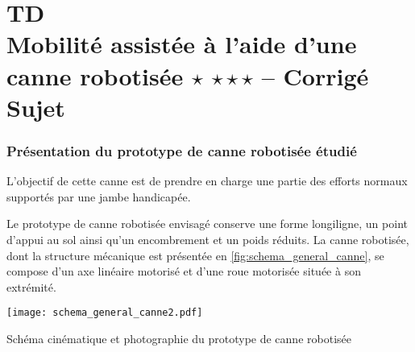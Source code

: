 \chapter*{TD  \\ 
Mobilité assistée à l'aide d'une canne robotisée \ifnormal $\star$ \else \fi \iftdifficile $\star\star\star$ \else \fi -- 
\ifprof Corrigé \else Sujet \fi}

\iflivret {} \else
\ifprof  {} \else \fi
\fi

\setcounter{question}{0}




\subsection*{Présentation du prototype de canne robotisée étudié}
\ifprof
\else

L'objectif de cette canne est de prendre en charge une partie des efforts normaux supportés par une jambe handicapée.

Le prototype de canne robotisée envisagé conserve une forme longiligne, un point d'appui au sol ainsi qu'un encombrement et un poids réduits. La canne robotisée, dont la structure mécanique est présentée en \ref{fig:schema_general_canne}, se compose d'un axe linéaire motorisé et d'une roue motorisée située à son extrémité.


\begin{marginfigure}%
\texttt{[image: schema\_general\_canne2.pdf]}
\caption{Schéma cinématique et photographie du prototype de canne robotisée}
\label{fig:schema_general_canne}
\end{marginfigure}



